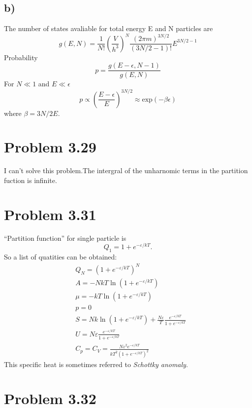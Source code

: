 \documentclass{article}
\begin{document}
\subsection*{b)}
The number of states avaliable for total energy E and N particles are
\begin{equation*}
g(E,N)=\frac{1}{N!}(\frac{V}{h^3})^N\frac{(2\pi m )^{3N/2}}{(3N/2-1)!}E^{3N/2-1}
\end{equation*}
Probability
\begin{equation*}
p=\frac{g(E-\epsilon,N-1)}{g(E,N)}
\end{equation*}
For $N\ll1$ and $E\ll\epsilon$
\begin{equation*}
p\propto\left(\frac{E-\epsilon}{E}\right)^{3N/2}\approx \mathrm{exp}(-\beta \epsilon)
\end{equation*}
where $\beta=3N/2E$.

\section*{Problem 3.29}
	I can't solve this problem.The intergral of the unharnomic terms in the partition fuction is infinite.
	
\section*{Problem 3.31}
	``Partition function'' for single particle is
	\begin{equation}
	Q_{1} = 1 + e^{-\varepsilon/kT}.
	\end{equation}
	So a list of quatities can be obtained:
	\begin{align}
	&Q_{N} = (1 + e^{-\varepsilon/kT})^{N} \\
	&A = - NkT \ln (1 + e^{-\varepsilon/kT}) \\
	&\mu = - kT \ln (1 + e^{-\varepsilon/kT}) \\
	&p=0 \\
	&S = Nk \ln (1 + e^{-\varepsilon/kT}) + \frac{N \varepsilon}{T} \frac{e^{-\varepsilon/kT}}{1+e^{-\varepsilon/kT}} \\
	&U =  N \varepsilon \frac{e^{-\varepsilon/kT}}{1+e^{-\varepsilon/kT}} \\
	&C_{p} = C_{V} =  \frac{N \varepsilon^{2} e^{-\varepsilon/kT}}{kT^{2} (1+e^{-\varepsilon/kT})^{2}}
	\end{align}
	This specific heat is sometimes referred to \emph{Schottky anomaly}. 

\section*{Problem 3.32}
\end{document}
